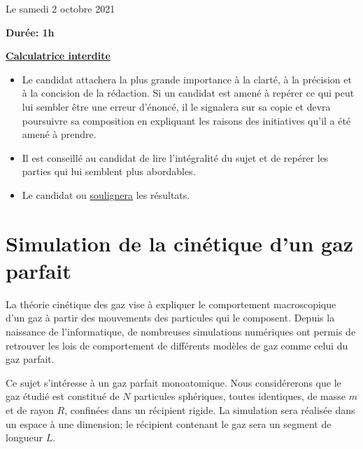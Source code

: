 \documentclass[twoside,french,11pt]{VcCours}
\begin{document}

\begin{center}
\large 
Le samedi 2 octobre 2021

\bigskip
\textbf{Durée: 1h}

\bigskip
\large\underline{\textbf{Calculatrice interdite}}
\end{center}

\bigskip
\begin{itemize}
  \item Le candidat attachera la plus grande importance à la clarté, à la précision et à la concision de la rédaction. Si un candidat est amené à repérer ce qui peut lui sembler être une erreur d'énoncé, il le signalera sur sa copie et devra poursuivre sa composition en expliquant les raisons des initiatives qu'il a été amené à prendre.
  \item Il est conseillé au candidat de lire l'intégralité du sujet et de repérer les parties qui lui semblent plus abordables.
  \item Le candidat  ou \underline{soulignera} les résultats. 
  \end{itemize}
\separationTitre

\section*{Simulation de la cinétique d'un gaz parfait}
La théorie cinétique des gaz vise à expliquer le comportement macroscopique d'un gaz à partir des mouvements
des particules qui le composent. Depuis la naissance de l'informatique, de nombreuses simulations numériques
ont permis de retrouver les lois de comportement de différents modèles de gaz comme celui du gaz parfait.

Ce sujet s'intéresse à un gaz parfait monoatomique. Nous considérerons que le gaz étudié est constitué de $N$
particules sphériques, toutes identiques, de masse $m$ et de rayon $R$, confinées dans un récipient rigide. La
simulation sera réalisée dans un espace à une dimension; le récipient contenant le gaz sera
un segment de longueur $L$.
\end{document}
